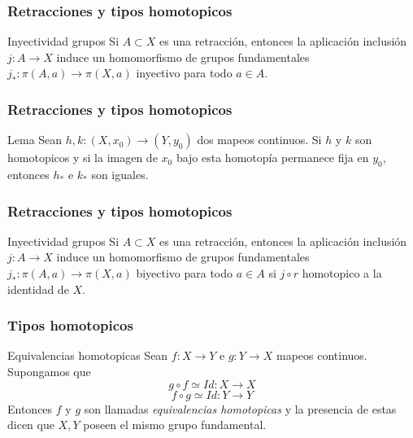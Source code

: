 \documentclass[xetex,mathserif,serif]{beamer}
\begin{document}
  \begin{frame}
    \frametitle{Retracciones y tipos homotopicos}
    \begin{block}{Inyectividad grupos}
      Si \(A \subset X\) es una retracción, entonces la aplicación
      inclusión \(j : A \to X\) induce un homomorfismo de grupos
      fundamentales \(j_{*} : \pi(A, a) \to \pi(X,a)\) inyectivo para
      todo \(a \in A\).
    \end{block}
  \end{frame}

  \begin{frame}
    \frametitle{Retracciones y tipos homotopicos}

    \begin{block}{Lema}
      Sean \(h,k : (X, x_0) \to (Y, y_0)\) dos mapeos continuos. Si
      \(h\) y \(k\) son homotopicos y si la imagen de \(x_0\) bajo esta
      homotopía permanece fija en \(y_0\), entonces \(h_*\) e \(k_*\) son
      iguales.
    \end{block}
  \end{frame}

  \begin{frame}
     \frametitle{Retracciones y tipos homotopicos}
     \begin{block}{Inyectividad grupos}
       Si \(A \subset X\) es una retracción, entonces la aplicación
       inclusión \(j : A \to X\) induce un homomorfismo de grupos
       fundamentales \(j_{*} : \pi(A, a) \to \pi(X,a)\) biyectivo para
       todo \(a \in A\) si \(j \circ r\) homotopico a la identidad de \(X\).
     \end{block}
  \end{frame}

  \begin{frame}
    \frametitle{Tipos homotopicos}
    \begin{block}{Equivalencias homotopicas}
      Sean \(f : X \to Y\) e \(g : Y \to X\) mapeos continuos. Supongamos
      que \[ g \circ f \simeq Id : X \to X \]
      \[ f \circ g \simeq Id : Y \to Y \]
      Entonces \(f\) y \(g\) son llamadas \emph{equivalencias
      homotopicas} y la presencia de estas dicen que \(X,Y\) poseen el
      mismo grupo fundamental.
    \end{block}
  \end{frame}
\end{document}

